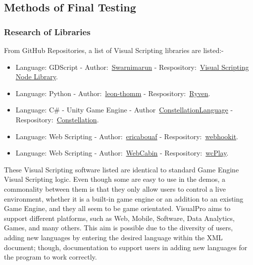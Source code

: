 \documentclass[conference]{IEEEtran}
\begin{document}
        \subsection{Methods of Final Testing}
          \subsubsection{Research of Libraries}
            From GitHub Repositories, a list of Visual Scripting libraries are listed:-
            \begin{itemize}
              \item Language: GDScript - Author:~\href{https://github.com/swarnimarun}{Swarnimarun} - Respository:~\href{https://github.com/swarnimarun/visual-scripting-node-library}{Visual Scripting Node Library}.
              \item Language: Python - Author:~\href{https://github.com/leon-thomm}{leon-thomm} - Respository:~\href{https://github.com/leon-thomm/Ryven}{Ryven}.
              \item Language: C\# - Unity Game Engine - Author~\href{https://github.com/ConstellationLanguage}{ConstellationLanguage} - Respository:~\href{https://github.com/ConstellationLanguage/Constellation}{Constellation}.
              \item Language: Web Scripting - Author:~\href{https://github.com/ericabouaf}{ericabouaf} - Respository:~\href{https://github.com/ericabouaf/webhookit}{webhookit}.
              \item Language: Web Scripting - Author:~\href{https://github.com/WebCabin}{WebCabin} - Respository:~\href{https://github.com/WebCabin/wcPlay}{wcPlay}.
            \end{itemize}

            These Visual Scripting software listed are identical to standard Game Engine Visual Scripting logic. Even though some are easy to use in the demos, a commonality between them is that they only allow users to control a live environment, whether it is a built-in game engine or an addition to an existing Game Engine, and they all seem to be game orientated. VisualPro aims to support different platforms, such as Web, Mobile, Software, Data Analytics, Games, and many others. This aim is possible due to the diversity of users, adding new languages by entering the desired language within the XML document; though, documentation to support users in adding new languages for the program to work correctly.
\end{document}
